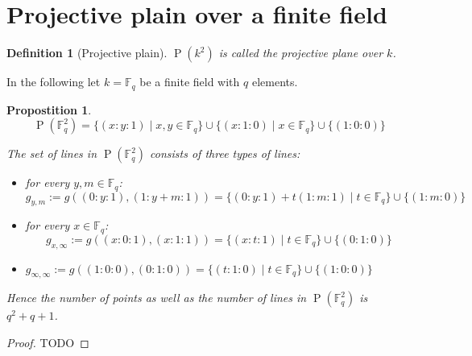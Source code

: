 \documentclass{article}
\newtheorem{definition}{Definition}
\newtheorem{propostition}{Propostition}
\begin{document}
	\section{Projective plain over a finite field}
	\begin{definition}[Projective plain]
		$\operatorname{P}(k^2)$ is called the projective plane over $k$.
	\end{definition}
	In the following let $k=\mathbb{F}_q$ be a finite field with $q$ elements.
	
	\begin{propostition}
		$$\operatorname{P}(\mathbb{F}_q^2)=\{(x:y:1)\mid x, y \in \mathbb{F}_q\}\cup \{(x:1:0)\mid x \in \mathbb{F}_q\}\cup \{(1:0:0)\}$$
	
		The set of lines in $\operatorname{P}(\mathbb{F}_q^2)$ consists of three types of lines:
		\begin{itemize}
			\item for every $y,m\in \mathbb{F}_q$: $$g_{y,m}:=g((0:y:1), (1:y+m:1))=\{(0:y:1)+ t(1:m:1)\mid t\in \mathbb{F}_q\}\cup \{(1:m:0)\}$$
			\item for every $x\in \mathbb{F}_q$: $$g_{x,\infty}:=g((x:0:1),(x:1:1))=\{(x:t:1)\mid t\in \mathbb{F}_q\}\cup \{(0:1:0)\}$$
			\item $g_{\infty, \infty}:=g((1:0:0),(0:1:0))=\{(t:1:0)\mid t\in \mathbb{F}_q\}\cup \{(1:0:0)\}$
		\end{itemize}
		Hence the number of points as well as the number of lines in $\operatorname{P}(\mathbb{F}_q^2)$ is $q^2 +q+1$.
	\end{propostition}
	\begin{proof}
		TODO
	\end{proof}
	
\end{document}
